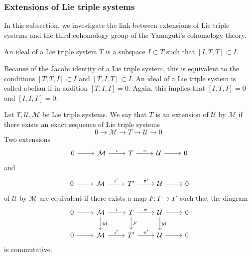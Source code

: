 \documentclass[11pt, twoside]{article}
\begin{document}
\subsubsection{Extensions of Lie triple systems}

In this subsection, we investigate the link between extensions of Lie triple systems and the third cohomology group of the Yamaguti's cohomology theory.

\begin{defi}
    An ideal of a Lie triple system $T$ is a subspace $I\subset T$ such that $[I,T,T]\subset I $.
\end{defi}

Because of the Jacobi identity of a Lie triple system, this is equivalent to the conditions $[T,T,I]\subset I $ and $[T,I,T]\subset I $. An ideal of a Lie triple system is called abelian if in addition $[T,I,I]=0 $. Again, this implies that $[I,T,I]=0 $ and $[I,I,T]=0 $.

\begin{defi}
    Let $T,
    \mathcal{U},\mathcal{M}$ be Lie triple systems. We say that $T$ is an extension of $\mathcal{U}$ by $\mathcal{M}$ if there exists an exact sequence of Lie triple systems $$0\to \mathcal{M}\to T\to \mathcal{U}\to 0. $$ Two extensions \[\begin{tikzcd}
	0 & \mathcal{M} & T & {\mathcal{U}} & 0
	\arrow[from=1-1, to=1-2]
	\arrow["\iota", from=1-2, to=1-3]
	\arrow["\pi", from=1-3, to=1-4]
	\arrow[from=1-4, to=1-5]
\end{tikzcd}\] and \[\begin{tikzcd}
	0 & \mathcal{M} & T' & {\mathcal{U}} & 0
	\arrow[from=1-1, to=1-2]
	\arrow["\iota'", from=1-2, to=1-3]
	\arrow["\pi'", from=1-3, to=1-4]
	\arrow[from=1-4, to=1-5]
\end{tikzcd}\] of $\mathcal{U}$ by $\mathcal{M}$ are equivalent if there exists a map $F:T\to T'$ such that the diagram \[\begin{tikzcd}
	0 & \mathcal{M} & T & {\mathcal{U}} & 0 \\
	0 & \mathcal{M} & {T'} & {\mathcal{U}} & 0
	\arrow[from=1-1, to=1-2]
	\arrow["\iota", from=1-2, to=1-3]
	\arrow["{\mathrm{id}}", from=1-2, to=2-2]
	\arrow["\pi", from=1-3, to=1-4]
	\arrow["F", from=1-3, to=2-3]
	\arrow[from=1-4, to=1-5]
	\arrow["{\mathrm{id}}", from=1-4, to=2-4]
	\arrow[from=2-1, to=2-2]
	\arrow["{\iota'}", from=2-2, to=2-3]
	\arrow["{\pi'}", from=2-3, to=2-4]
	\arrow[from=2-4, to=2-5]
\end{tikzcd}\] is commutative. 
\end{defi}
\end{document}
